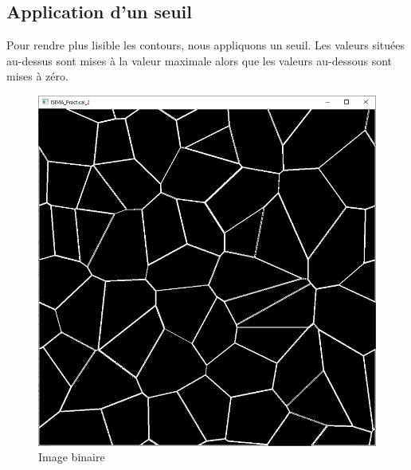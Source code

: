 \documentclass{article}
\begin{document}
\subsection{Application d'un seuil}
Pour rendre plus lisible les contours, nous appliquons un seuil. Les valeurs situées au-dessus sont mises à la valeur maximale alors que les valeurs au-dessous sont mises à zéro.

\begin{figure}[H]
	\centering
	\includegraphics[scale=0.4]{images/level.png}
	\caption{Image binaire}
\end{figure}
\end{document}
